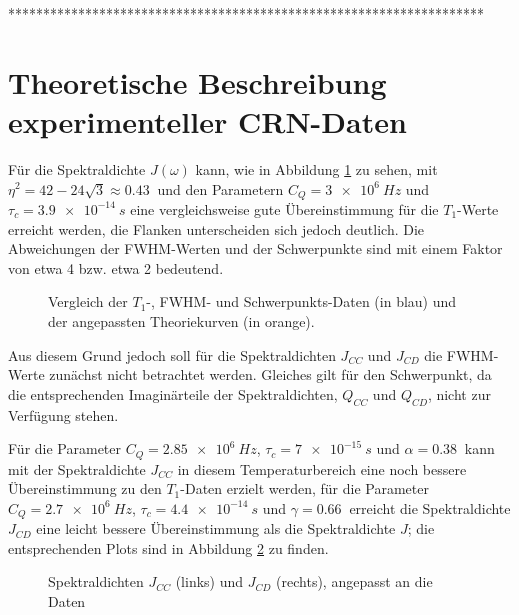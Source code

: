 ********************************************************************


\section{Theoretische Beschreibung experimenteller CRN-Daten} \label{section:theo:daten}






Für die Spektraldichte $J(\omega)$ kann, wie in Abbildung \ref{fig:triple_vergleich} zu sehen, mit $\eta^2 = 42 - 24 \sqrt{3} \approx \SI{0.43}{}$ \cite{caer} und den Parametern $C_Q = \SI{3e6}{Hz}$ und $\tau_c = \SI{3.9e-14}{s}$ eine vergleichsweise gute Übereinstimmung für die $T_1$-Werte erreicht werden, die Flanken unterscheiden sich jedoch deutlich. Die Abweichungen der FWHM-Werten und der Schwerpunkte sind mit einem Faktor von etwa 4 bzw. etwa 2 bedeutend.
\begin{figure}[htbp]
	\caption{Vergleich der $T_1$-, FWHM- und Schwerpunkts-Daten (in blau) und der angepassten Theoriekurven (in orange). \label{fig:triple_vergleich}}
\end{figure}




Aus diesem Grund jedoch soll für die Spektraldichten $J_{CC}$ und $J_{CD}$ die FWHM-Werte zunächst nicht betrachtet werden. Gleiches gilt für den Schwerpunkt, da die entsprechenden Imaginärteile der Spektraldichten, $Q_{CC}$ und $Q_{CD}$, nicht zur Verfügung stehen.

Für die Parameter $C_Q = \SI{2.85e6}{Hz}$, $\tau_c = \SI{7e-15}{s}$ und $\alpha = \SI{0.38}{}$ kann mit der Spektraldichte $J_{CC}$ in diesem Temperaturbereich eine noch bessere Übereinstimmung zu den $T_1$-Daten erzielt werden, für die Parameter $C_Q = \SI{2.7e6}{Hz}$, $\tau_c = \SI{4.4e-14}{s}$ und $\gamma = \SI{0.66}{}$ erreicht die Spektraldichte $J_{CD}$ eine leicht bessere Übereinstimmung als die Spektraldichte $J$; die entsprechenden Plots sind in Abbildung \ref{fig:j_cc_j_cd} zu finden.
\begin{figure}[H]
	\centering
	\begin{subfigure}{0.49\textwidth}
		\centering
	\end{subfigure}%
	\begin{subfigure}{0.49\textwidth}
		\centering
	\end{subfigure}
	\caption{Spektraldichten $J_{CC}$ (links) und $J_{CD}$ (rechts), angepasst an die Daten}
	\label{fig:j_cc_j_cd}
\end{figure}











